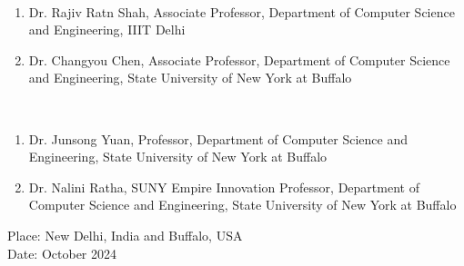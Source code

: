 \begin{singlespacing}
{
 \\
\begin{enumerate}
    \item Dr. Rajiv Ratn Shah, Associate Professor, Department of Computer Science and Engineering, IIIT Delhi
    \item Dr. Changyou Chen, Associate Professor, Department of Computer Science and Engineering, State University of New York at Buffalo
\end{enumerate}


 \\
\begin{enumerate}
    \item Dr. Junsong Yuan, Professor, Department of Computer Science and Engineering, State University of New York at Buffalo
    \item Dr. Nalini Ratha, SUNY Empire Innovation Professor, Department of Computer Science and Engineering, State University of New York at Buffalo
\end{enumerate}



\noindent Place: New Delhi, India and Buffalo, USA\\
\noindent Date: October 2024
} 
\end{singlespacing}
\vspace*{0.25in}